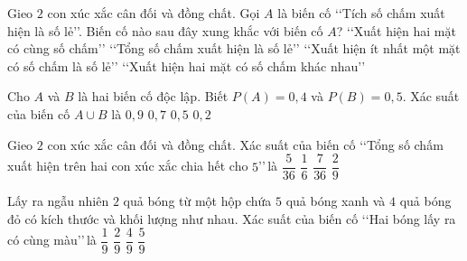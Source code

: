 \begin{ex}%
	Gieo $2$ con xúc xắc cân đối và đồng chất. Gọi $A$ là biến cố \lq\lq Tích số chấm xuất hiện là số lẻ\rq\rq. Biến cố nào sau đây xung khắc với biến cố $A$?
	\choice
	{\lq\lq Xuất hiện hai mặt có cùng số chấm\rq\rq}
	{\True \lq\lq Tổng số chấm xuất hiện là số lẻ\rq\rq}
	{\lq\lq Xuất hiện ít nhất một mặt có số chấm là số lẻ\rq\rq}
	{\lq\lq Xuất hiện hai mặt có số chấm khác nhau\rq\rq}
\end{ex}
\begin{ex}%
	Cho $A$ và $B$ là hai biến cố độc lập. Biết $P(A)=0{,}4$ và $P(B)=0{,}5$. Xác suất của biến cố $A \cup B$ là
	\choice
	{$0{,}9$ }
	{\True $0{,}7$} 
	{$0{,}5$} 
	{$0{,}2$}
\end{ex}
\begin{ex}%
	Gieo $2$ con xúc xắc cân đối và đồng chất. Xác suất của biến cố \lq\lq Tổng số chấm xuất hiện trên hai con xúc xắc chia hết cho $5$\rq\rq$\,$là
	\choice
	{$\dfrac{5}{36}$}
	{$\dfrac{1}{6}$}
	{\True $\dfrac{7}{36}$}
	{$\dfrac{2}{9}$}
\end{ex}
\begin{ex}%
	Lấy ra ngẫu nhiên $2$ quả bóng từ một hộp chứa $5$ quả bóng xanh và $4$ quả bóng đỏ có kích thước và khối lượng như nhau. Xác suất của biến cố \lq\lq Hai bóng lấy ra có cùng màu\rq\rq $\,$là
	\choice
	{$\dfrac{1}{9}$}
	{$\dfrac{2}{9}$}
	{\True $\dfrac{4}{9}$}
	{$\dfrac{5}{9}$}
\end{ex}
